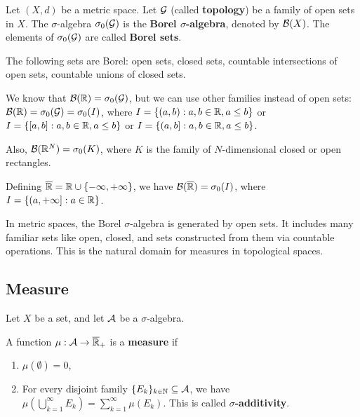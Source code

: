\begin{definition}
Let $(X,d)$ be a metric space. Let $\mathcal{G}$ (called \textbf{topology}) be a family of open sets in $X$.
The $\sigma$-algebra $\sigma_0(\mathcal{G})$ is the \textbf{Borel $\sigma$-algebra}, denoted by $\mathcal{B}(X)$.
The elements of $\sigma_0(\mathcal{G})$ are called \textbf{Borel sets}.
\end{definition}

\begin{remark}
The following sets are Borel: open sets, closed sets, countable intersections of open sets, countable unions of closed sets.
\end{remark}

\begin{example}
We know that $\mathcal{B}(\mathbb{R}) = \sigma_0(\mathcal{G})$, but we can use other families instead of open sets:
$\mathcal{B}(\mathbb{R}) = \sigma_0(\mathcal{G}) = \sigma_0(I)$, where
$I = \{(a,b) : a,b \in \mathbb{R}, a \leq b\}$ or
$I = \{[a,b] : a,b \in \mathbb{R}, a \leq b\}$ or
$I = \{(a,b] : a,b \in \mathbb{R}, a \leq b\}$.

Also, $\mathcal{B}(\mathbb{R}^N) = \sigma_0(K)$, where $K$ is the family of $N$-dimensional closed or open rectangles.

Defining $\overline{\mathbb{R}} = \mathbb{R} \cup \{-\infty, +\infty\}$, we have $\mathcal{B}(\overline{\mathbb{R}}) = \sigma_0(I)$, where $I = \{(a, +\infty] : a \in \mathbb{R}\}$.
\end{example}

\begin{remark}
In metric spaces, the Borel $\sigma$-algebra is generated by open sets. It includes many familiar sets like open, closed, and sets constructed from them via countable operations. This is the natural domain for measures in topological spaces.
\end{remark}

\clearpage
\subsection{Measure}
Let $X$ be a set, and let $\mathcal{A}$ be a $\sigma$-algebra.

\begin{definition}
A function $\mu: \mathcal{A} \to \overline{\mathbb{R}}_+$ is a \textbf{measure} if
\begin{enumerate}
    \item $\mu(\emptyset) = 0$,
    \item For every disjoint family $\{E_k\}_{k \in \mathbb{N}} \subseteq \mathcal{A}$, we have $\mu\left(\bigcup_{k=1}^{\infty} E_k\right) = \sum_{k=1}^{\infty} \mu(E_k)$.
    This is called \textbf{$\sigma$-additivity}.
\end{enumerate}
\end{definition}

